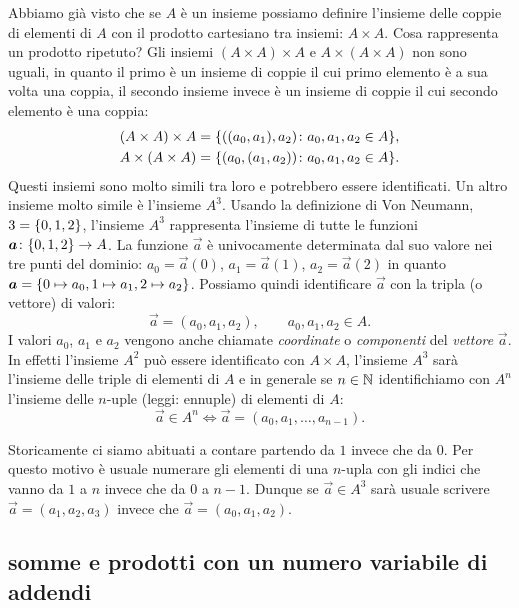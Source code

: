 Abbiamo già visto che se $A$ è un insieme possiamo definire l'insieme 
delle coppie di elementi di $A$ con il prodotto cartesiano tra insiemi: 
$A\times A$. 
Cosa rappresenta un prodotto ripetuto?
Gli insiemi $(A\times A)\times A$ e $A\times(A\times A)$ non sono 
uguali, in quanto il primo è un insieme di coppie il cui primo elemento 
è a sua volta una coppia, il secondo insieme invece è un insieme di coppie 
il cui secondo elemento è una coppia:
\begin{gather*}
  (A\times A)\times A = {\left\{ ((a_0,a_1),a_2)\colon a_0,a_1,a_2\in A \right\}},
  \\
  A \times (A\times A) = {\left\{ (a_0,(a_1,a_2))\colon a_0,a_1,a_2\in A \right\}}.
\end{gather*}
Questi insiemi sono molto simili tra loro e potrebbero essere identificati.
Un altro insieme molto simile è l'insieme $A^{3}$.  
Usando la definizione di Von Neumann, $3 = {\left\{ 0,1,2 \right\}}$, l'insieme 
$A^{3}$ rappresenta l'insieme di tutte le funzioni 
$\boldsymbol a\colon {\left\{ 0,1,2 \right\}}\to A$.
La funzione $\vec a$ è univocamente determinata dal suo valore nei 
tre punti del dominio: $a_0 = \vec a(0)$, $a_1=\vec a(1)$, $a_2=\vec a(2)$
in quanto $\boldsymbol a = {\left\{ 0\mapsto a_0, 1\mapsto a_1, 2\mapsto a_2 \right\}}$.
Possiamo quindi identificare $\vec a$ con la tripla (o vettore) di valori:
\[
  \vec a = (a_0, a_1, a_2), \qquad a_0,a_1,a_2 \in A.  
\]
I valori $a_0$, $a_1$ e $a_2$ vengono anche chiamate \emph{coordinate}
o \emph{componenti} del \emph{vettore} $\vec a$.
%
%
%
%
%
In effetti l'insieme $A^{2}$ può essere identificato con $A\times A$, l'insieme 
$A^{3}$ sarà l'insieme delle triple di elementi di $A$ e in generale se $n\in{\mathbb N}$ 
identifichiamo con $A^{n}$ l'insieme delle $n$-uple (leggi: ennuple) di elementi 
%
di $A$:%
%
\[
   \vec a \in A^{n} \iff 
   \vec a = (a_0, a_1, \dots, a_{n-1}).  
\]

Storicamente ci siamo abituati a contare partendo da $1$ invece che da $0$.
Per questo motivo è usuale numerare gli elementi di una $n$-upla con gli indici 
che vanno da $1$ a $n$ invece che da $0$ a $n-1$.
Dunque se $\vec a \in A^{3}$ sarà usuale scrivere 
$\vec a = (a_1, a_2, a_3)$ invece che $\vec a = (a_0, a_1, a_2)$.

\subsection{somme e prodotti con un numero variabile di addendi}
%
%

